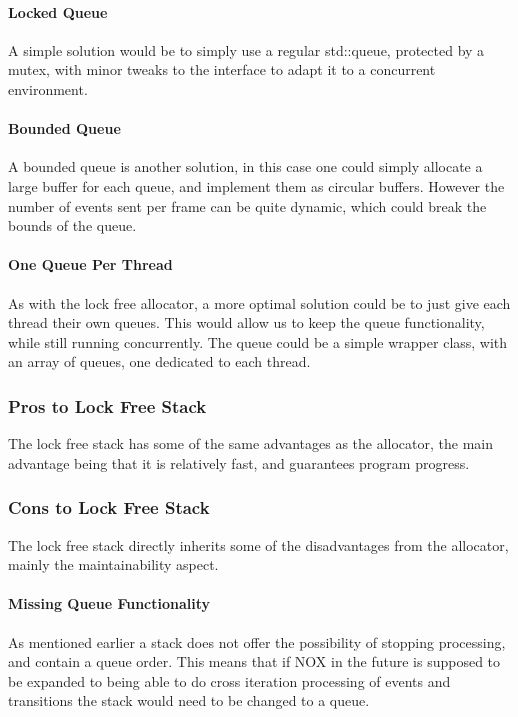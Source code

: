 \paragraph{Locked Queue}
A simple solution would be to simply use a regular std::queue, protected by a mutex,
with minor tweaks to the interface to adapt it to a concurrent environment.

\paragraph{Bounded Queue}
A bounded queue is another solution, in this case one could simply allocate a large
buffer for each queue, and implement them as circular buffers.
However the number of events sent per frame can be quite dynamic, which could break the
bounds of the queue.

\paragraph{One Queue Per Thread}
As with the lock free allocator, a more optimal solution could be to just give each thread
their own queues. This would allow us to keep the queue functionality, while still running
concurrently. The queue could be a simple wrapper class, with an array of queues, one dedicated
to each thread.

\subsubsection{Pros to Lock Free Stack}
The lock free stack has some of the same advantages as the allocator,
the main advantage being that it is relatively fast, and guarantees program progress.

\subsubsection{Cons to Lock Free Stack}
The lock free stack directly inherits some of the disadvantages from the allocator,
mainly the maintainability aspect.

\paragraph{Missing Queue Functionality}
As mentioned earlier a stack does not offer the possibility of stopping processing,
and contain a queue order.
This means that if NOX in the future is supposed to be expanded to being able to
do cross iteration processing of events and transitions the stack would need to be changed
to a queue.

